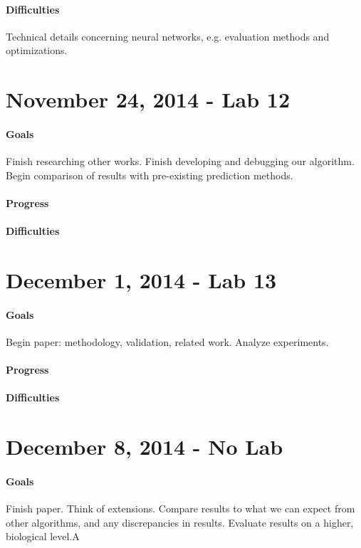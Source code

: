 \documentclass[11pt]{article}
\begin{document}
\paragraph{Difficulties} Technical details concerning neural networks, e.g. evaluation methods and optimizations.

\section{November 24, 2014 - Lab 12}

\paragraph{Goals} Finish researching other works. Finish developing and debugging our algorithm. Begin comparison of results with pre-existing prediction methods.

\paragraph{Progress}
\paragraph{Difficulties}

\section{December 1, 2014 - Lab 13}

\paragraph{Goals} Begin paper: methodology, validation, related work. Analyze experiments.  
\paragraph{Progress}
\paragraph{Difficulties}

\section{December 8, 2014 - No Lab}

\paragraph{Goals} Finish paper. Think of extensions. Compare results to what we can expect from other algorithms, and any discrepancies in results. Evaluate results on a higher, biological level.A
\end{document}
